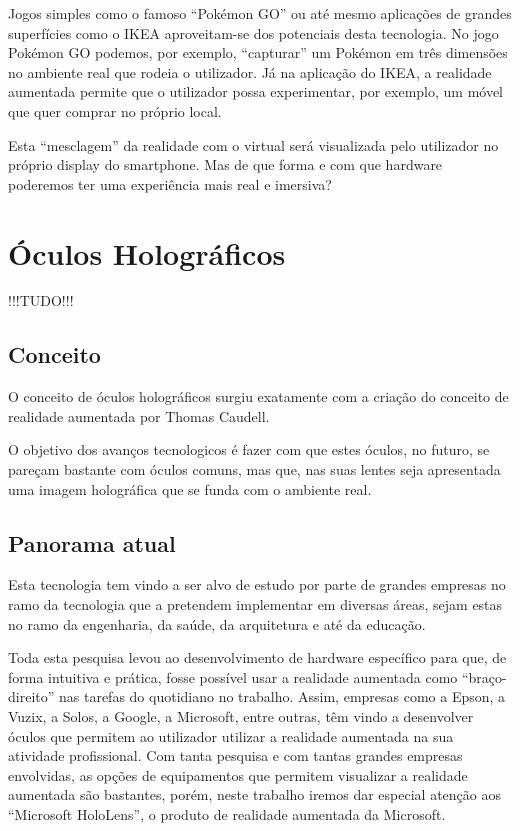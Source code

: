 \documentclass{report}
\begin{document}
Jogos simples como o famoso “Pokémon GO” ou até mesmo aplicações de grandes superfícies como o IKEA aproveitam-se dos potenciais desta tecnologia. No jogo Pokémon GO podemos, por exemplo, “capturar” um Pokémon em três dimensões no ambiente real que rodeia o utilizador. Já na aplicação do IKEA, a realidade
aumentada permite que o utilizador possa experimentar, por exemplo, um móvel que quer comprar no próprio local.

Esta “mesclagem” da realidade com o virtual será visualizada pelo utilizador no próprio display do smartphone. Mas de que forma e com que hardware poderemos ter uma experiência mais real e imersiva?

\chapter{Óculos Holográficos}
\label{chap.oculos-holograficos}
!!!TUDO!!!

\section{Conceito}
O conceito de óculos holográficos surgiu exatamente com a criação do conceito de realidade aumentada por Thomas Caudell.

O objetivo dos avanços tecnologicos é fazer com que estes óculos, no futuro, se pareçam bastante com óculos comuns, mas que, nas suas lentes seja apresentada uma
imagem holográfica que se funda com o ambiente real.

\section{Panorama atual}
Esta tecnologia tem vindo a ser alvo de estudo por parte de grandes empresas no ramo da tecnologia que a pretendem implementar em diversas áreas, sejam estas no ramo da engenharia, da saúde, da arquitetura e até da educação.

Toda esta pesquisa levou ao desenvolvimento de hardware específico para que, de forma intuitiva e prática, fosse possível usar a realidade aumentada como “braço-direito” nas tarefas do quotidiano no trabalho. Assim, empresas como a Epson, a Vuzix, a Solos, a Google, a Microsoft, entre outras, têm vindo a desenvolver óculos que permitem ao utilizador utilizar a realidade aumentada na sua atividade profissional. Com tanta pesquisa e com tantas grandes empresas envolvidas, as opções de equipamentos que permitem visualizar a realidade aumentada são bastantes, porém, neste trabalho iremos dar especial atenção aos “Microsoft HoloLens”, o produto de realidade aumentada da Microsoft.
\end{document}
